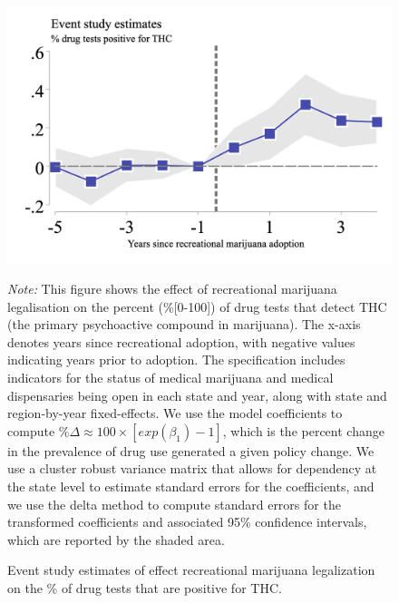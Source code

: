 \documentclass[12pt]{article}%
\begin{document}
\begin{figure}[H]
    \caption{Event study estimates of effect recreational marijuana legalization on the \% of drug tests that are positive for THC.}
    \begin{minipage}{\linewidth}
      \includegraphics[width=\linewidth]{../output/plots/event-study-percent_test_positive_for_thc.png}
       \label{fig:event-study-drug-tests}
        \vspace{-1cm}
              \begin{justify}
                {\footnotesize
                    \emph{Note:} 
             This figure shows the effect of recreational marijuana legalisation on the percent (\%[0-100]) of drug tests that detect THC (the primary psychoactive compound in marijuana). 
       The x-axis denotes years since recreational adoption, with negative values indicating years prior to adoption. 
       The specification includes indicators for the status of medical marijuana and medical dispensaries being open in each state and year, along with state and region-by-year fixed-effects.
       We use the model coefficients to compute $\% \Delta \approx 100\times \left[exp(\beta_1)-1\right]$, which is the percent change in the prevalence of drug use generated a given policy change.  We use a cluster robust variance matrix that allows for dependency at the state level to estimate standard errors for the coefficients, and we use the delta method to compute standard errors for the transformed coefficients and associated 95\% confidence intervals, which are reported by the shaded area.
                \par}
            \end{justify}
       \end{minipage}
    \end{figure}
\FloatBarrier
\end{document}

